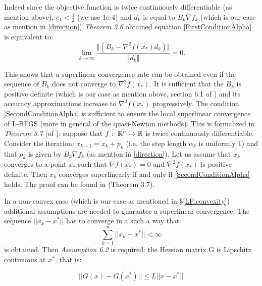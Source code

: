  Indeed since the objective function is twice continuously differentiable (as mention above), $c_{1}<\frac{1}{2}$ (we use 1e-4) and $d_{k}$ is equal to $B_{k}\nabla f_{k}$ (which is our case as mention in \ref{direction}) \textit{Theorem 3.6} obtained equation \ref{FirstConditionAlpha} is equivalent to: 
\begin{equation}
\label{SecondConditionAlpha}
 \lim_{k\to\infty}\frac{\Vert (B_{k} - \nabla^2f(x_*) d_{k})\Vert}{\Vert d_{k} \Vert} = 0.
\end{equation}

This shows that a superlinear convergence rate can be obtained even if the sequence of $B_{k}$ does not converge to $\nabla^2f(x_*)$. It is sufficient that the $B_{k}$ is positive definite (which is our case as mention above, section 6.1 of \cite{numerical}) and its accuracy approximations increase to $\nabla^2f(x_*)$ progressively. The condition \ref{SecondConditionAlpha} is sufficient to ensure the local superlinear convergence of L-BFGS (more in general of the quasi-Newton methods). This is formalized in \textit{Theorem 3.7} (of \cite{numerical}):
suppose that $f: \textnormal{ }\mathbb{R}^n \rightarrow \mathbb{R}$ is twice continuously differentiable. Consider the iteration: $x_{k+1}=x_{k} + p_{k}$ (i.e. the step length $\alpha_{k}$ is uniformly 1) and that $p_{k}$ is given by $B_{k}\nabla f_{k}$ (as mention in \ref{direction}). Let us assume that $x_{k}$ converges to a point $x_{*}$ such that $\nabla f(x_{*}) = 0$ and $\nabla^2f(x_{*})$ is positive definite. Then $x_{k}$ converges superlinearly if and only if \ref{SecondConditionAlpha} holds. The proof can be found in \cite{numerical} (Theorem 3.7). 

In a non-convex case (which is our case as mentioned in \S \ref{LF:convexity}) additional assumptions are needed to guarantee a superlinear convergence. The sequence $|| x_{k} - x^* ||$ has to converge in a such a way that 
\begin{equation}
\label{eq:convergence-sequence}
\sum_{k=1}^{\infty}|| x_{k} - x^* ||<\infty
\end{equation}
is obtained. Then \textit{Assumption 6.2} is required: the Hessian matrix G is Lipschitz continuous at $x^*$, that is: 

\begin{equation}
|| G(x)-G(x^*)  || \le L || x - x^*||
\end{equation}

